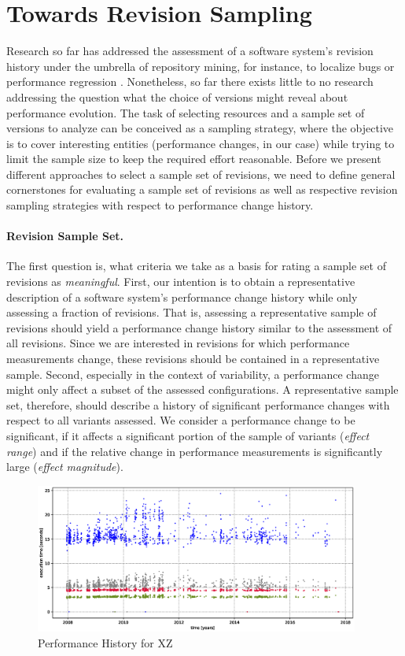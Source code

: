 \section{Towards Revision Sampling}\label{sec:towards_revsampling}
Research so far has addressed the assessment of a software system’s revision
history under the umbrella of repository mining, for instance, to localize bugs
\citep{moin_bug_2010} or performance regression \citep{heger_automated_2013}.
Nonetheless, so far there exists little to no research addressing the question
what the choice of versions might reveal about performance evolution. The task
of selecting resources and a sample set of versions to analyze can be conceived
as a sampling strategy, where the objective is to cover interesting entities
(performance changes, in our case) while trying to limit the sample size to
keep the required effort reasonable. Before we present different approaches to
select a sample set of revisions, we need to define general cornerstones for
evaluating a sample set of revisions as well as respective revision sampling
strategies with respect to performance change history.

\paragraph{Revision Sample Set.} The first question is, what criteria we take as
a basis for rating a sample set of revisions as \emph{meaningful}. First, our intention
is to obtain a representative description of a software system’s performance
change history while only assessing a fraction of revisions. That is, assessing
a representative sample of revisions should yield a performance change history
similar to the assessment of all revisions. Since we are interested in
revisions for which performance measurements change, these revisions should be
contained in a representative sample. Second, especially in the context of
variability, a performance change might only affect a subset of the assessed
configurations. A representative sample set, therefore, should describe a
history of significant performance changes with respect to all variants
assessed. We consider a performance change to be significant, if it affects a
significant portion of the sample of variants (\emph{effect range}) and if the
relative change in performance measurements is significantly large (\emph{effect
magnitude}).

\begin{figure}[h!]
	\centering
	\includegraphics[width=0.95\textwidth]{images/xz_sample_evolution.eps}
	\caption{Performance History for XZ}
	\label{fig:xz_evosample}
\end{figure}

